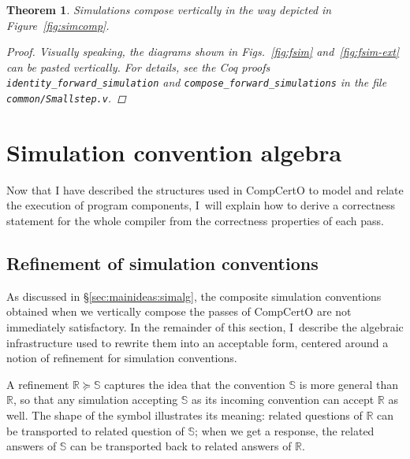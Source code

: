 \documentclass[11pt,oneside]{book}
\newtheorem{theorem}{Theorem}[chapter]
\theoremstyle{definition}
\newcommand{\scref}{\succeq} %
\begin{document}
\begin{theorem} \label{thm:fsim-vcomp} %
Simulations compose vertically
in the way depicted in Figure~\ref{fig:simcomp}.
\begin{proof}
Visually speaking,
the diagrams shown in Figs.~\ref{fig:fsim} and~\ref{fig:fsim-ext}
can be pasted vertically.
For details,
see the Coq proofs
\texttt{identity\_forward\_simulation}
and \texttt{compose\_forward\_simulations}
in the file \texttt{common/Smallstep.v}.
\end{proof}
\end{theorem}




\section{Simulation convention algebra} \label{sec:simalg} %

Now that I have described the structures used
in CompCertO
to model and relate the execution of program components,
I~will explain how to derive a correctness statement for the whole compiler
from the correctness properties of each pass.

\subsection{Refinement of simulation conventions} \label{sec:scref} %

As discussed in \S\ref{sec:mainideas:simalg},
the composite simulation conventions obtained
when we vertically compose the passes of CompCertO
are not immediately satisfactory.
In the remainder of this section,
I~describe the algebraic infrastructure used
to rewrite them into an acceptable form,
centered around
a notion of refinement for simulation conventions.

A refinement $\mathbb{R} \scref \mathbb{S}$
captures the idea that the convention $\mathbb{S}$
is more general than $\mathbb{R}$,
so that any simulation accepting $\mathbb{S}$ as its
incoming convention can accept $\mathbb{R}$ as well.
The shape of the symbol illustrates its meaning:
related questions of $\mathbb{R}$ can be transported to
related question of $\mathbb{S}$;
when we get a response, the
related answers of $\mathbb{S}$ can be transported back to
related answers of $\mathbb{R}$.
\end{document}
